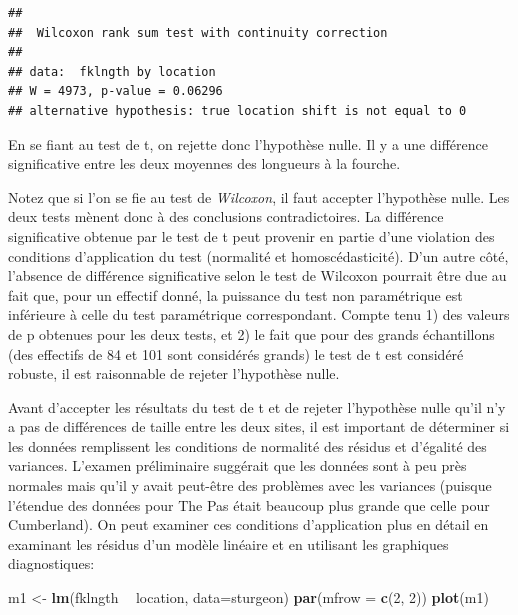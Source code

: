 \documentclass[12pt,]{book}
\newenvironment{Shaded}{\begin{snugshade}}{\end{snugshade}}
\newcommand{\DataTypeTok}[1]{\textcolor[rgb]{0.13,0.29,0.53}{#1}}
\newcommand{\DecValTok}[1]{\textcolor[rgb]{0.00,0.00,0.81}{#1}}
\newcommand{\KeywordTok}[1]{\textcolor[rgb]{0.13,0.29,0.53}{\textbf{#1}}}
\newcommand{\NormalTok}[1]{#1}
\newcommand{\OperatorTok}[1]{\textcolor[rgb]{0.81,0.36,0.00}{\textbf{#1}}}
\newcommand{\StringTok}[1]{\textcolor[rgb]{0.31,0.60,0.02}{#1}}
\begin{document}
\begin{verbatim}
## 
##  Wilcoxon rank sum test with continuity correction
## 
## data:  fklngth by location
## W = 4973, p-value = 0.06296
## alternative hypothesis: true location shift is not equal to 0
\end{verbatim}

En se fiant au test de t, on rejette donc l'hypothèse nulle. Il y a une différence significative entre les deux moyennes des longueurs à la fourche.

Notez que si l'on se fie au test de \emph{Wilcoxon}, il faut accepter l'hypothèse nulle. Les deux tests mènent donc à des conclusions contradictoires. La différence significative obtenue par le test de t peut provenir en partie d'une violation des conditions d'application du test (normalité et homoscédasticité). D'un autre côté, l'absence de différence significative selon le test de Wilcoxon pourrait être due au fait que, pour un effectif donné, la puissance du test non paramétrique est inférieure à celle du test paramétrique correspondant. Compte tenu 1) des valeurs de p obtenues pour les deux tests, et 2) le fait que pour des grands échantillons (des effectifs de 84 et 101 sont considérés grands) le test de t est considéré robuste, il est raisonnable de rejeter l'hypothèse nulle.

Avant d'accepter les résultats du test de t et de rejeter l'hypothèse nulle qu'il n'y a pas de différences de taille entre les deux sites, il est important de déterminer si les données remplissent les conditions de normalité des résidus et d'égalité des variances. L'examen préliminaire suggérait que les données sont à peu près normales mais qu'il y avait peut-être des problèmes avec les variances (puisque l'étendue des données pour The Pas était beaucoup plus grande que celle pour Cumberland). On peut examiner ces conditions d'application plus en détail en examinant les résidus d'un modèle linéaire et en utilisant les graphiques diagnostiques:

\begin{Shaded}
\begin{Highlighting}[]
\NormalTok{m1 <-}\StringTok{ }\KeywordTok{lm}\NormalTok{(fklngth }\OperatorTok{~}\StringTok{ }\NormalTok{location, }\DataTypeTok{data=}\NormalTok{sturgeon)}
\KeywordTok{par}\NormalTok{(}\DataTypeTok{mfrow =} \KeywordTok{c}\NormalTok{(}\DecValTok{2}\NormalTok{, }\DecValTok{2}\NormalTok{))}
\KeywordTok{plot}\NormalTok{(m1)}
\end{Highlighting}
\end{Shaded}
\end{document}
